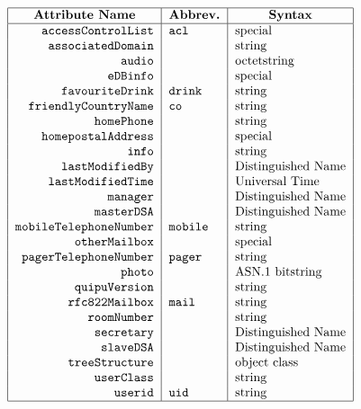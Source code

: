 \begin{bwslide}

\smaller

\[\begin{tabular}{|r|l|l|}
\hline
\multicolumn{1}{|c|}{\bf Attribute Name}&
	\multicolumn{1}{c|}{\bf Abbrev.}&
			\multicolumn{1}{c|}{\bf Syntax}\\
\hline
\verb"accessControlList"&\verb"acl"&special\\
\verb"associatedDomain"&&string\\
\verb"audio"&&octetstring\\
\verb"eDBinfo"&&special\\
\verb"favouriteDrink"&\verb"drink"&string\\
\verb"friendlyCountryName"&\verb"co"&string\\
\verb"homePhone"&&string\\
\verb"homepostalAddress"&&special\\
\verb"info"&&string\\
\verb"lastModifiedBy"&&Distinguished Name\\
\verb"lastModifiedTime"&& Universal Time\\
\verb"manager"&&Distinguished Name\\
\verb"masterDSA"&&Distinguished Name\\
\verb"mobileTelephoneNumber"&\verb"mobile"&string\\
\verb"otherMailbox"&&special\\
\verb"pagerTelephoneNumber"&\verb"pager"&string\\
\verb"photo"&&ASN.1 bitstring\\
\verb"quipuVersion"&&string\\
\verb"rfc822Mailbox"&\verb"mail"&string\\
\verb"roomNumber"&&string\\
\verb"secretary"&&Distinguished Name\\
\verb"slaveDSA"&&Distinguished Name\\
\verb"treeStructure"&&object class\\
\verb"userClass"&&string\\
\verb"userid"&\verb"uid"&string\\
\hline
\end{tabular}\]
\end{bwslide}


